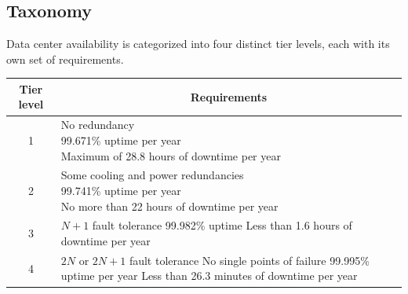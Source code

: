 \subsection{Taxonomy}
Data center availability is categorized into four distinct tier levels, each with its own set of requirements.
\begin{table}[H]
    \centering
    \begin{tabular}{|c|l|}
    \hline
    Tier level & \multicolumn{1}{c|}{Requirements} \\ \hline
    1          & \makecell[l]{No redundancy \\ 99.671\% uptime per year \\ Maximum of 28.8 hours of downtime per year }                                 \\\hline
    2          & \makecell[l]{Some cooling and power redundancies \\ 99.741\% uptime per year \\ No more than 22 hours of downtime per year}    \\\hline
    3          & \makecell[l]{$N+1$ fault tolerance \\ 99.982\% uptime \\ Less than 1.6 hours of downtime per year} \\\hline
    4          & \makecell[l]{$2N$ or $2N+1$ fault tolerance \\ No single points of failure \\ 99.995\% uptime per year \\ Less than 26.3 minutes of downtime per year}                                 \\ \hline
    \end{tabular}
\end{table}
